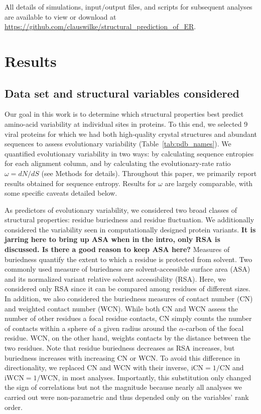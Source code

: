 \documentclass[smallextended]{svjour3}
\begin{document}
All details of simulations, input$/$output files, and scripts for subsequent analyses are available to view or download at \url{https://github.com/clauswilke/structural\_prediction\_of\_ER}.

\section*{Results}

\subsection*{Data set and structural variables considered}

Our goal in this work is to determine which structural properties best predict amino-acid variability at individual sites in proteins. To this end, we selected 9 viral proteins for which we had both high-quality crystal structures and abundant sequences to assess evolutionary variability (Table~\ref{tab:pdb_names}). We quantified evolutionary variability in two ways: by calculating sequence entropies for each alignment column, and by calculating the evolutionary-rate ratio $\omega=dN/dS$ (see Methods for details). Throughout this paper, we primarily report results obtained for sequence entropy. Results for $\omega$ are largely comparable, with some specific caveats detailed below.

As predictors of evolutionary variability, we considered two broad classes of structural properties: residue buriedness and residue fluctuation. We additionally considered the variability seen in computationally designed protein variants. \textbf{It is jarring here to bring up ASA when in the intro, only RSA is discussed. Is there a good reason to keep ASA here?} Measures of buriedness quantify the extent to which a residue is protected from solvent. Two commonly used measure of buriedness are solvent-accessible surface area (ASA) and its normalized variant relative solvent accessibility (RSA). Here, we considered only RSA since it can be compared among residues of different sizes. In addition, we also considered the buriedness measures of contact number (CN) and weighted contact number (WCN). While both CN and WCN assess the number of other residues a focal residue contacts, CN simply counts the number of contacts within a sphere of a given radius around the $\alpha$-carbon of the focal residue. WCN, on the other hand, weights contacts by the distance between the two residues. Note that residue buriedness decreases as RSA increases, but buriedness increases with increasing CN or WCN. To avoid this difference in directionality, we replaced CN and WCN with their inverse, $\text{iCN}=1/\text{CN}$ and $\text{iWCN}=1/\text{WCN}$, in most analyses. Importantly, this substitution only changed the sign of correlations but not the magnitude because nearly all analyses we carried out were non-parametric and thus depended only on the variables' rank order.
\end{document}
